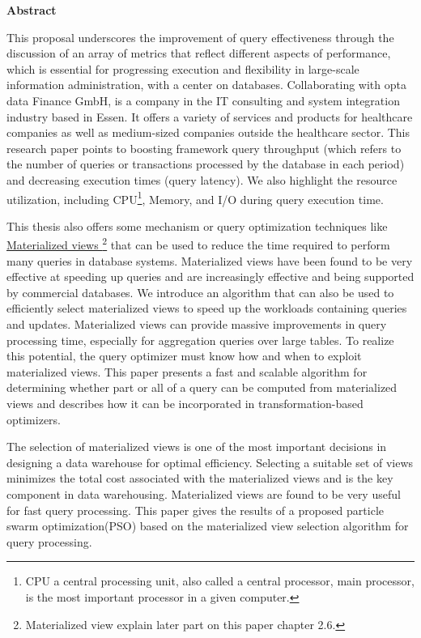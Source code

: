 \thispagestyle{empty}
\begin{center}
    \fancyhead[]{}\Large\textbf{Abstract}
\end{center}

\normalsize
This proposal underscores the improvement of query effectiveness through the discussion of an array of metrics that reflect different aspects of performance, which is essential for progressing execution and flexibility in large-scale information administration, with a center on databases. Collaborating with opta data Finance GmbH, is a company in the IT consulting and system integration industry based in Essen. It offers a variety of services and products for healthcare companies as well as medium-sized companies outside the healthcare sector. This research paper points to boosting framework query throughput (which refers to the number of queries or transactions processed by the database in each period) and decreasing execution times (query latency). We also highlight the resource utilization,  including CPU\footnote{CPU a central processing unit, also called a central processor, main processor, is the most important processor in a given computer.}, Memory, and I/O during query execution time.\vspace{.4cm}

This thesis also offers some mechanism or query optimization techniques like \hyperref[term:materialized_views]{Materialized views \footnote{Materialized view explain later part on this paper chapter 2.6.}} that can be used to reduce the time required to perform many queries in database systems. Materialized views have been found to be very effective at speeding up queries and are increasingly effective and being supported by commercial databases. We introduce an algorithm that can also be used to efficiently select materialized views to speed up the workloads containing queries and updates. Materialized views can provide massive improvements in query processing time, especially for aggregation queries over large tables. To realize this potential, the query optimizer must know how and when to exploit materialized views. This paper presents a fast and scalable algorithm for determining whether part or all of a query can be computed from materialized views and describes how it can be incorporated in transformation-based optimizers.\vspace{.4cm}

The selection of materialized views is one of the most important decisions in designing a data warehouse for optimal efficiency. Selecting a suitable set of views minimizes the total cost associated with the materialized views and is the key component in data warehousing. Materialized views are found to be very useful for fast query processing. This paper gives the results of a proposed particle swarm optimization(PSO) based on the materialized view selection algorithm for query processing.\vspace{.4cm}



